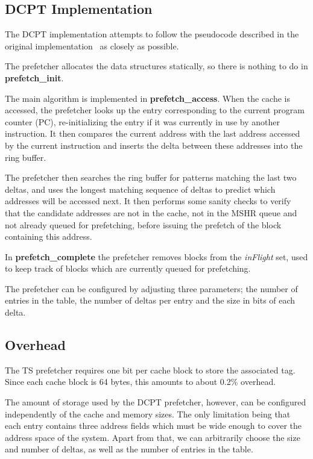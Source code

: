 \subsection{DCPT Implementation}



The DCPT implementation attempts to follow the pseudocode described in the
original implementation~\cite{dcpt} as closely as possible.

The prefetcher allocates the data structures statically, so there is nothing to do in \textbf{prefetch\_init}.

The main algorithm is implemented in
\textbf{prefetch\_access}. When the cache is accessed, the prefetcher looks up the entry corresponding to the current program counter (PC), re-initializing the entry if it was currently in use by another instruction. It then compares the current address with the last address accessed by the current instruction and inserts the delta between these addresses into the ring buffer.

The prefetcher then searches the ring buffer for patterns matching the last two deltas, and uses the longest matching sequence of deltas to predict which addresses will be accessed next. It then performs some sanity checks to verify that the candidate addresses are not in the cache, not in the MSHR queue and not already queued for prefetching, before issuing the prefetch of the block containing this address.

In \textbf{prefetch\_complete} the prefetcher removes blocks from the \emph{inFlight} set, used to keep track of blocks which are currently queued for prefetching.

The prefetcher can be configured by adjusting three parameters; the number of
entries in the table, the number of deltas per entry and the size in bits of
each delta.

\subsection{Overhead}

The TS prefetcher requires one bit per cache block to store the
associated tag. Since each cache block is 64 bytes, this amounts to about 0.2\%
overhead.

The amount of storage used by the DCPT prefetcher, however, can be configured
independently of the cache and memory sizes. The only limitation being that each
entry contains three address fields which must be wide enough to cover the
address space of the system. Apart from that, we can arbitrarily choose the size
and number of deltas, as well as the number of entries in the table.

